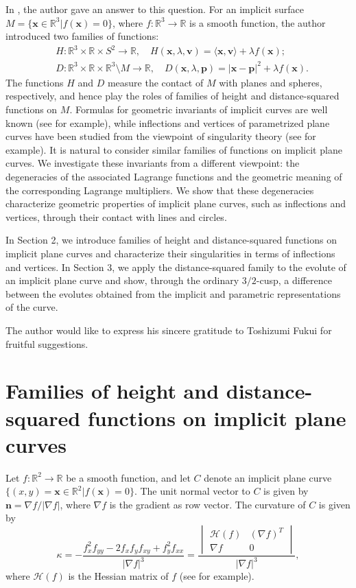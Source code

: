 \documentclass[10pt,a4paper]{amsart}
\newcommand{\R}{\mathbb{R}}
\newcommand{\n}{\mathbf{n}}
\renewcommand{\v}{\mathbf{v}}
\newcommand{\x}{\mathbf{x}}
\newcommand{\p}{\mathbf{p}}
\begin{document}
In \cite{Hasegawa2017}, the author gave an answer to this question. 
For an implicit surface $M=\{\x\in\R^3|f(\x)=0\}$, where $f:\R^3\to\R$ is a smooth function, the author introduced two families of functions:
\begin{align*}
& H:\R^3\times\R\times S^2 \to \R,\quad H(\x,\lambda,\v)= \langle \x,\v \rangle+\lambda f(\x);\\
& D:\R^3\times\R\times\R^3\setminus M \to\R,\quad D(\x,\lambda,\p) = |\x-\p|^2+\lambda f(\x). 
\end{align*}
The functions $H$ and $D$ measure the contact of $M$ with planes and spheres, respectively, and hence play the roles of families of height and distance-squared functions on $M$. 
Formulas for geometric invariants of implicit curves are well known (see \cite{Goldman2005} for example), while inflections and vertices of parametrized plane curves have been studied from the viewpoint of singularity theory (see \cite{DT2018,ST2017} for example).
It is natural to consider similar families of functions on implicit plane curves. 
We investigate these invariants from a different viewpoint:
the degeneracies of the associated Lagrange functions and the geometric
meaning of the corresponding Lagrange multipliers. 
We show that these degeneracies characterize geometric properties of implicit plane curves, such as inflections and vertices, through their contact with lines and circles.

In Section 2, we introduce families of height and distance-squared functions on implicit plane curves and characterize their singularities in terms of inflections and vertices. 
In Section 3, we apply the distance-squared family to the evolute of an
implicit plane curve and show, through the ordinary $3/2$-cusp, a
difference between the evolutes obtained from the implicit and
parametric representations of the curve.

The author would like to express his sincere gratitude to Toshizumi Fukui for fruitful suggestions. 


\section{Families of height and distance-squared functions on implicit plane curves}

Let $f:\R^2\to\R$ be a smooth function, and let $C$ denote an implicit plane curve $\{(x,y)=\x\in\R^2|f(\x)=0\}$. The unit normal vector to $C$ is given by $\n=\nabla f/|\nabla f|$, where $\nabla f$ is the gradient as row vector. The curvature of $C$ is given by
\begin{equation}
\label{eq:kappa}
\kappa = -\dfrac{f_x^2 f_{yy} - 2 f_x f_y f_{xy} + f_y^2 f_{xx}}{|\nabla f|^3} = \dfrac{\begin{vmatrix}
\mathcal{H}(f) & (\nabla f)^T \\ 
\nabla f & 0
\end{vmatrix}}
{|\nabla f|^3},
\end{equation}
where $\mathcal{H}(f)$ is the Hessian matrix of $f$ (see \cite{Goldman2005} for example).
\end{document}
